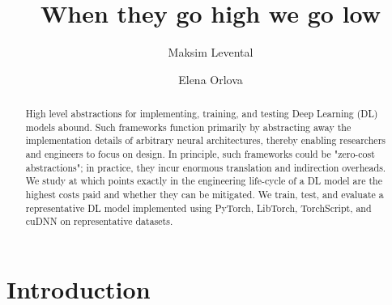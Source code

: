 \documentclass[sigconf]{acmart}
\begin{document}
\title{When they go high we go low}

\author{Maksim Levental}
\author{Elena Orlova}

\renewcommand{\shortauthors}{Levental and Orlova}

\begin{abstract}
  High level abstractions for implementing, training, and testing Deep Learning (DL) models abound.
  Such frameworks function primarily by abstracting away the implementation details of arbitrary neural architectures, thereby enabling researchers and engineers to focus on design.
  In principle, such frameworks could be "zero-cost abstractions";
  in practice, they incur enormous translation and indirection overheads.
  We study at which points exactly in the engineering life-cycle of a DL model are the highest costs paid and whether they can be mitigated.
  We train, test, and evaluate a representative DL model implemented using PyTorch, LibTorch, TorchScript, and cuDNN on representative datasets.
\end{abstract}

%

\maketitle

\section{Introduction}\label{sec:introduction}
\end{document}

